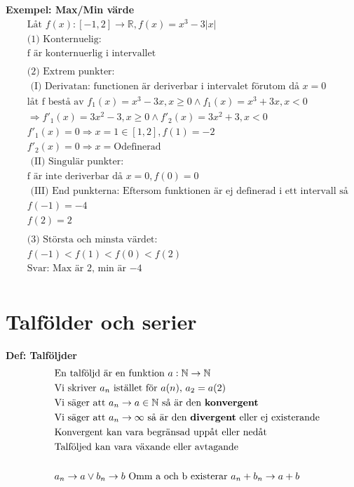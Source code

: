 \documentclass{article}
\begin{document}
\textbf{Exempel: Max/Min värde}
\begin{align*}
  &\quad  \text{Låt } f(x):[-1,2]\to\mathbb{R}, f(x)=x^3-3|x|  \\
  &\quad  \text{(1) Konternuelig: } \\
  &\quad  \text{f är konternuerlig i intervallet}   \\
  &\quad  \\
  &\quad  \text{(2) Extrem punkter: }   \\
  &\quad  \text{ (I) Derivatan: functionen är deriverbar i intervalet förutom då } x=0 \\
  &\quad  \text{låt f bestå av } f_1(x)=x^3-3x, x \geq 0 \land f_1(x)=x^3+3x, x<0 \\
  &\quad  \Rightarrow f'_1(x)=3x^2-3, x \geq 0 \land f'_2(x)=3x^2+3, x<0 \\
  &\quad   f'_1(x)=0 \Rightarrow x=1 \in [1,2], f(1)=-2  \\
  &\quad   f'_2(x)=0 \Rightarrow x= \text{Odefinerad} \\
  &\quad  \text{ (II) Singulär punkter:} \\
  &\quad  \text{f är inte deriverbar då } x=0, f(0)=0 \\
  &\quad  \text{ (III) End punkterna: Eftersom funktionen är ej definerad i ett intervall så finns det inga } \\
  &\quad  f(-1)=-4 \\
  &\quad  f(2) = 2 \\
  &\quad  \\
  &\quad  \text{(3) Största och minsta värdet: } \\
  &\quad  f(-1)<f(1)<f(0)<f(2)  \\
  &\quad  \text{Svar: Max är $2$, min är $-4$}  \\
\end{align*}


\newpage


\section{Talfölder och serier}
\textbf{Def: Talföljder}
\begin{align*}
  &\quad  \text{En talföljd är en funktion } a:\mathbb{N}\to\mathbb{N}  \\
  &\quad  \text{Vi skriver $a_n$ istället för $a(n)$, $a_2=a(2)$} \\
  &\quad  \text{Vi säger att $a_n\to{a}\in\mathbb{N}$ så är den \textbf{konvergent}} \\
  &\quad  \text{Vi säger att $a_n\to\infty$ så är den \textbf{divergent} eller ej existerande} \\
  &\quad  \text{Konvergent kan vara begränsad uppåt eller nedåt} \\
  &\quad  \text{Talföljed kan vara växande eller avtagande} \\
  &\quad  \\
  &\quad  a_n\to{a}\lor{b_n\to{b}} \text{ Omm a och b existerar } a_n+b_n\to{a+b} \\
\end{align*}
\end{document}
